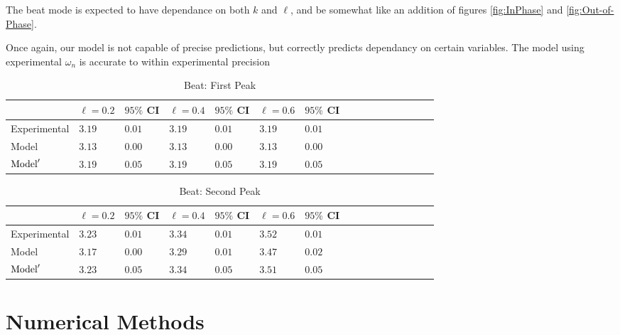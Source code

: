 \documentclass[aps,prl,reprint,10pt,amsmath,amssymb,superscriptaddress,a4paper, floatfix]{revtex4-2}
\begin{document}
The beat mode is expected to have dependance on both $k$ and $\ell$, and be somewhat like an addition of figures \ref{fig:InPhase} and \ref{fig:Out-of-Phase}.

Once again, our model is not capable of precise predictions, but correctly predicts dependancy on certain variables. The model using experimental $\omega_n$ is accurate to within experimental precision

\begin{table}[h]
    \begin{tabular}{llllllllllllllll}
    \toprule
                            & $\ell = 0.2$   & $95\%$ CI    & $\ell = 0.4$   & $95\%$ CI    & $\ell = 0.6$   & $95\%$ CI    & \\ \midrule
    Experimental            & $3.19$         & $0.01$       & $3.19$         & $0.01$       & $3.19$         & $0.01$       & \\ 
    Model                   & $3.13$         & $0.00$       & $3.13$         & $0.00$       & $3.13$         & $0.00$       & \\ 
    $\textnormal{Model}'$   & $3.19$         & $0.05$       & $3.19$         & $0.05$       & $3.19$         & $0.05$       & \\ \bottomrule
    \end{tabular}
    \caption{Beat: First Peak}
\end{table}

\begin{table}[h]
    \begin{tabular}{llllllllllllllll}
    \toprule
                            & $\ell = 0.2$   & $95\%$ CI    & $\ell = 0.4$   & $95\%$ CI    & $\ell = 0.6$   & $95\%$ CI    & \\ \midrule
    Experimental            & $3.23$         & $0.01$       & $3.34$         & $0.01$       & $3.52$         & $0.01$       & \\ 
    Model                   & $3.17$         & $0.00$       & $3.29$         & $0.01$       & $3.47$         & $0.02$       & \\ 
    $\textnormal{Model}'$   & $3.23$         & $0.05$       & $3.34$         & $0.05$       & $3.51$         & $0.05$       & \\ \bottomrule
    \end{tabular}
    \caption{Beat: Second Peak}
\end{table}
        
\section{Numerical Methods}
\end{document}
